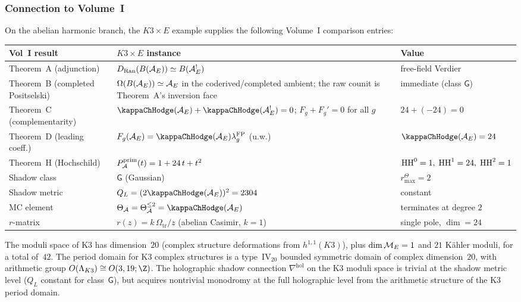 \subsubsection{Connection to Volume~I}
\label{subsubsec:k3e-vol1-connection}

On the abelian harmonic branch, the $K3 \times E$ example supplies the
following Volume~I comparison entries:

\begin{center}
\renewcommand{\arraystretch}{1.25}
\small
\begin{tabular}{lll}
\textbf{Vol~I result} & \textbf{$K3 \times E$ instance} & \textbf{Value} \\
\hline
Theorem~A (adjunction) & $D_{\mathrm{Ran}}(B(\mathcal{A}_E))
 \simeq B(\mathcal{A}_E^!)$ & free-field Verdier \\
Theorem~B (completed Positselski) & $\Omega(B(\mathcal{A}_E)) \simeq \mathcal{A}_E$
 in the coderived/completed ambient; the raw counit is Theorem~A's
 inversion face & immediate (class $\mathsf{G}$) \\
Theorem~C (complementarity) &
 $\kappaChHodge(\cA_E)+\kappaChHodge(\cA_E^!) = 0$;
 $F_g + F_g' = 0$ for all $g$ & $24 + ({-}24) = 0$ \\
Theorem~D (leading coeff.) & $F_g(\cA_E) =
 \kappaChHodge(\cA_E)\lambda_g^{\mathrm{FP}}$
 \textup{(}u.w.\textup{)} & $\kappaChHodge(\cA_E)=24$ \\
Theorem~H (Hochschild) & $P_{\mathcal{A}}^{\mathrm{prim}}(t) =
 1 + 24\,t + t^2$ & $\operatorname{HH}^0 = 1,\; \operatorname{HH}^1 = 24,\; \operatorname{HH}^2 = 1$ \\
\hline
Shadow class & $\mathsf{G}$ (Gaussian) & \(r^\Theta_{\max} = 2\) \\
Shadow metric & \(Q_L = (2\kappaChHodge(\cA_E))^2 = 2304\) & constant \\
MC element & \(\Theta_\cA = \Theta_\cA^{\leq 2}
= \kappaChHodge(\cA_E)\)
 & terminates at degree $2$ \\
$r$-matrix & $r(z) = k\,\Omega_{\mathrm{tr}}/z$ \textup{(}abelian Casimir, $k=1$\textup{)} &
 single pole, $\dim = 24$
\end{tabular}
\end{center}

\noindent
The moduli space of K3 has dimension~$20$ (complex structure
deformations from $h^{1,1}(K3)$), plus $\dim \mathcal{M}_E = 1$
and $21$ K\"ahler moduli, for a total of~$42$.
The period domain for K3 complex structures is a
type~$\mathrm{IV}_{20}$ bounded symmetric domain of
complex dimension~$20$, with arithmetic group
$O(\Lambda_{K3}) \cong O(3, 19; \Z)$.
The holographic shadow connection $\nabla^{\mathrm{hol}}$ on the
K3 moduli space is trivial at the shadow metric level
($Q_L$ constant for class~$\mathsf{G}$), but acquires nontrivial
monodromy at the full holographic level from the arithmetic structure
of the K3 period domain.


